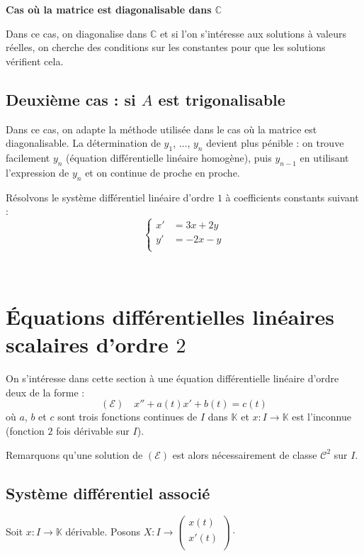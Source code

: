 \documentclass[french,11pt,twoside]{VcCours}
\begin{document}
\textbf{Cas où la matrice est diagonalisable dans $\mathbb{C}$} 

Dans ce cas, on diagonalise dans $\mathbb{C}$ et si l'on s'intéresse aux solutions à valeurs réelles, on cherche des conditions sur les constantes pour que les solutions vérifient cela.

\subsection{Deuxième cas : si $A$ est trigonalisable}

Dans ce cas, on adapte la méthode utilisée dans le cas où la matrice est diagonalisable. La détermination de $y_1$, $\ldots$, $y_n$ devient plus pénible : on trouve facilement $y_n$ (équation différentielle linéaire homogène), puis $y_{n-1}$ en utilisant l'expression de $y_n$ et on continue de proche en proche. 

\medskip

\begin{Exemple} Résolvons le système différentiel linéaire d'ordre $1$ à coefficients constants suivant : 
$$ \left\lbrace \begin{array}{lll}
    x' & = 3x + 2y \\
    y' & = -2x - y \\
    \end{array}\right.$$
\end{Exemple}

\vspace{10cm}

\newpage

$\phantom{test}$

\vspace{6cm}
\section{Équations différentielles linéaires scalaires d'ordre $2$}

On s'intéresse dans cette section à une équation différentielle linéaire d'ordre deux de la forme :
$$ (\mathcal{E}) \quad x''+a(t)x'+b(t)=c(t)$$
où $a$, $b$ et $c$ sont trois fonctions continues de $I$ dans $\mathbb{K}$ et $x : I \rightarrow \mathbb{K}$ est l'inconnue (fonction $2$ fois dérivable sur $I$).

\medskip

Remarquons qu'une solution de $(\mathcal{E})$ est alors nécessairement de classe $\mathcal{C}^2$ sur $I$.


\subsection{Système différentiel associé}
Soit $x : I \rightarrow \mathbb{K}$ dérivable. Posons $X : I \rightarrow \begin{pmatrix}
x(t) \\
x'(t) \\
\end{pmatrix} \cdot$
\end{document}
